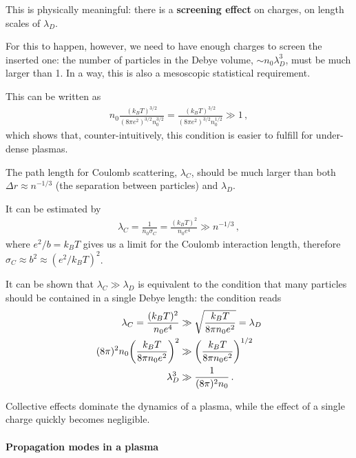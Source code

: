 \documentclass[main.tex]{subfiles}
\begin{document}
This is physically meaningful: there is a \textbf{screening effect} on charges, on length scales of \(\lambda _D\). 

For this to happen, however, we need to have enough charges to screen the inserted one: the number of particles in the Debye volume, \(\sim n_0 \lambda _D^3\), must be much larger than 1. 
In a way, this is also a mesoscopic statistical requirement. 

This can be written as 
%
\begin{align}
n_0 \frac{(k_BT)^{3/2}}{( 8 \pi e^2)^{3/2} n_0^{3/2}} 
= \frac{(k_BT)^{3/2}}{( 8 \pi e^2)^{3/2} n_0^{1/2}} 
\gg 1
\,,
\end{align}
%
which shows that, counter-intuitively, this condition is easier to fulfill for under-dense plasmas. 

The path length for Coulomb scattering, \(\lambda _C\), should be much larger than both \(\Delta r \approx n^{-1/3}\) (the separation between particles) and \(\lambda _D\). 

It can be estimated by 
%
\begin{align}
\lambda _C = \frac{1}{n_0 \sigma _C} = \frac{(k_B T)^2}{n_0 e^{4}} \gg n^{-1/3} 
\,,
\end{align}
%
where \(e^2 / b = k_B T\) gives us a limit for the Coulomb interaction length, therefore \(\sigma _C \approx b^2 \approx (e^2 / k_B T)^2\). 


\begin{extracontent}
It can be shown that \(\lambda _C \gg \lambda _D\) is equivalent to the condition that many particles should be contained in a single Debye length: the condition reads 
%
\begin{align}
\lambda _C = \frac{(k_B T)^2}{n_0 e^{4}} &\gg \sqrt{\frac{k_B T}{8 \pi n_0 e^2}} = \lambda _D   \\
(8 \pi)^2 n_0 \qty(\frac{k_B T}{8 \pi n_0 e^2})^2 &\gg  \qty( \frac{k_BT}{ 8 \pi n_0 e^2})^{1/2}  \\
\lambda _D^3 &\gg \frac{1}{(8 \pi )^2 n_0 }
\,.
\end{align}
\end{extracontent}

Collective effects dominate the dynamics of a plasma, while the effect of a single charge quickly becomes negligible.

\paragraph{Propagation modes in a plasma}
\end{document}
